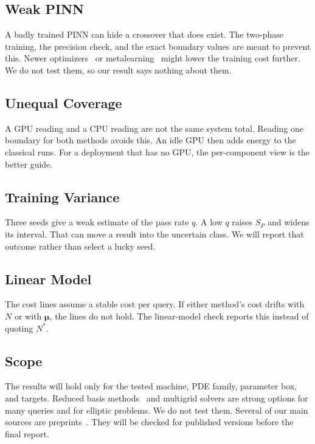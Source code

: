 \documentclass[journal]{IEEEtran}
\newcommand{\Nstar}{N^{\ast}}
\begin{document}
\subsection{Weak PINN}
A badly trained PINN can hide a crossover that does exist. The two-phase training, the precision check, and the exact boundary values are meant to prevent this. Newer optimizers~\cite{wang2025soap} or metalearning~\cite{penwarden2023} might lower the training cost further. We do not test them, so our result says nothing about them.

\subsection{Unequal Coverage}
A GPU reading and a CPU reading are not the same system total. Reading one boundary for both methods avoids this. An idle GPU then adds energy to the classical runs. For a deployment that has no GPU, the per-component view is the better guide.

\subsection{Training Variance}
Three seeds give a weak estimate of the pass rate $q$. A low $q$ raises $S_P$ and widens its interval. That can move a result into the uncertain class. We will report that outcome rather than select a lucky seed.

\subsection{Linear Model}
The cost lines assume a stable cost per query. If either method's cost drifts with $N$ or with $\boldsymbol{\mu}$, the lines do not hold. The linear-model check reports this instead of quoting $\Nstar$.

\subsection{Scope}
The results will hold only for the tested machine, PDE family, parameter box, and targets. Reduced basis methods~\cite{hesthaven2016} and multigrid solvers are strong options for many queries and for elliptic problems. We do not test them. Several of our main sources are preprints~\cite{huang2026review,huangstuart2026,zhang2026,kapoor2025}. They will be checked for published versions before the final report.

\end{document}
